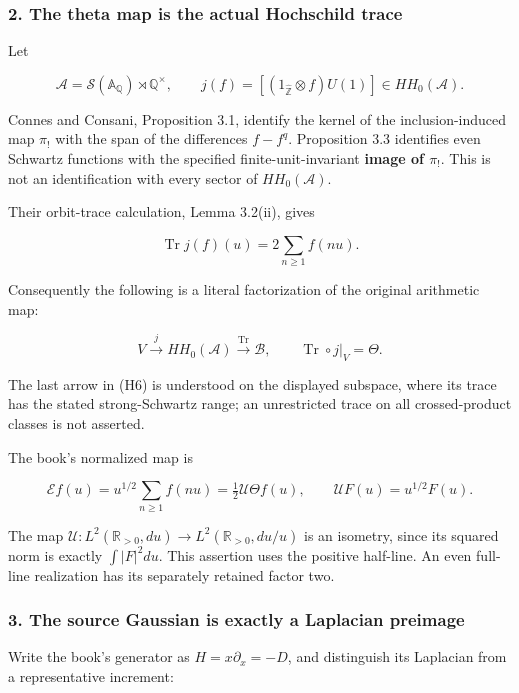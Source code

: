 \subsubsection{2. The theta map is the actual Hochschild trace}\label{endpoint-cc_hochschild--the-theta-map-is-the-actual-hochschild-trace}

Let

\[
\mathcal A=\mathcal S(\mathbb A_{\mathbb Q})\rtimes\mathbb Q^\times,\qquad
j(f)=[(1_{\widehat{\mathbb Z}}\otimes f)U(1)]\in HH_0(\mathcal A).
\tag{H4}
\]

Connes and Consani, Proposition 3.1, identify the kernel of the inclusion-induced map \(\pi_!\) with the span of the differences \(f-f^q\). Proposition 3.3 identifies even Schwartz functions with the specified finite-unit-invariant \textbf{image of \(\pi_!\)}. This is not an identification with every sector of \(HH_0(\mathcal A)\).

Their orbit-trace calculation, Lemma 3.2(ii), gives

\[
\operatorname{Tr}j(f)(u)=2\sum_{n\ge1}f(nu).
\tag{H5}
\]

Consequently the following is a literal factorization of the original arithmetic map:

\[
V\xrightarrow{j}HH_0(\mathcal A)\xrightarrow{\operatorname{Tr}}\mathscr B,
\qquad \operatorname{Tr}\circ j|_V=\Theta.
\tag{H6}
\]

The last arrow in (H6) is understood on the displayed subspace, where its trace has the stated strong-Schwartz range; an unrestricted trace on all crossed-product classes is not asserted.

The book's normalized map is

\[
\mathcal E f(u)=u^{1/2}\sum_{n\ge1}f(nu)=\tfrac12\mathcal U\Theta f(u),\qquad \mathcal UF(u)=u^{1/2}F(u).
\tag{H7}
\]

The map \(\mathcal U:L^2(\mathbb R_{>0},du)\to L^2(\mathbb R_{>0},du/u)\) is an isometry, since its squared norm is exactly \(\int|F|^2du\). This assertion uses the positive half-line. An even full-line realization has its separately retained factor two.

\subsubsection{3. The source Gaussian is exactly a Laplacian preimage}\label{endpoint-cc_hochschild--the-source-gaussian-is-exactly-a-laplacian-preimage}

Write the book's generator as \(H=x\partial_x=-D\), and distinguish its Laplacian from a representative increment:

